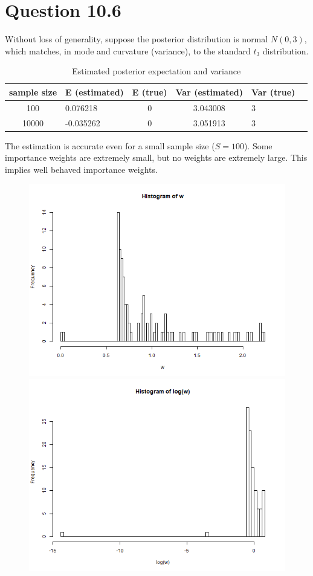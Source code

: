 \documentclass{article}
\begin{document}
\section*{Question 10.6}
{
    Without loss of generality, suppose the posterior distribution is normal $N(0, 3)$, which matches, in mode and curvature (variance), to the standard $t_3$ distribution. 
    \begin{table}[H]
        \centering
        \caption{Estimated posterior expectation and variance}
        \begin{tabular}{@{}clc@{}clc@{}}
        \toprule
        sample size & \multicolumn{1}{c}{E (estimated)} & \multicolumn{1}{c}{E (true)} & \multicolumn{1}{c}{Var (estimated)} & \multicolumn{1}{c}{Var (true)}  \\ \midrule
        100 & 0.076218 & 0 & 3.043008 & 3   \\ 
        10000 & -0.035262 & 0 & 3.051913 & 3  \\ \bottomrule
        \end{tabular}
    \end{table}
    The estimation is accurate even for a small sample size ($S=100$).
    Some importance weights are extremely small, but no weights are extremely large. This implies well behaved importance weights.
    \begin{figure}[H]
        \centering
        \includegraphics[width = 0.6\linewidth]{1_weight_100.png}
        \includegraphics[width = 0.6\linewidth]{1_log_weight_100.png}

\end{figure}}
\end{document}
